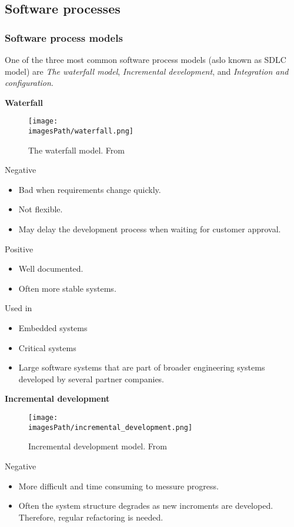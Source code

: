 \subsection{Software processes}
\subsubsection{Software process models}
One of the three most common software process models (aslo known as SDLC model) are \textit{The waterfall model},
\textit{Incremental development}, and \textit{Integration and configuration}.


\textbf{Waterfall}
\begin{figure}[!ht]
    \centering
    \texttt{[image: \\imagesPath/waterfall.png]}
    \caption{The waterfall model. From \cite{}}
\end{figure}

Negative
\begin{itemize}
  \item Bad when requirements change quickly.
  \item Not flexible.
  \item May delay the development process when waiting for customer approval.
\end{itemize}

Positive
\begin{itemize}
  \item Well documented.
  \item Often more stable systems.
\end{itemize}

Used in
\begin{itemize}
  \item Embedded systems
  \item Critical systems
  \item Large software systems that are part of broader engineering systems developed
by several partner companies.
\end{itemize}

\textbf{Incremental development}
\begin{figure}[!ht]
    \centering
    \texttt{[image: \\imagesPath/incremental\_development.png]}
    \caption{Incremental development model. From \cite{}}
\end{figure}

Negative
\begin{itemize}
  \item More difficult and time consuming to messure progress.
  \item Often the system structure degrades as new incroments are developed. Therefore, regular refactoring is needed.
\end{itemize}

